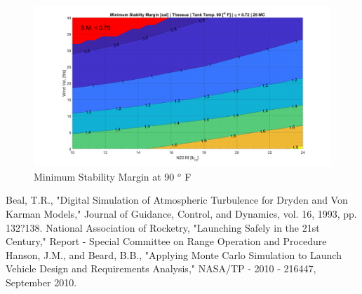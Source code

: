\documentclass[10pt,a4paper]{article}
\begin{document}
 \begin{figure}[h!]
	\centering
	\includegraphics[width=1\textwidth]{./figs/stab_90.png}
	\caption{Minimum Stability Margin at 90 $^o$ F}
	\label{fig:stab_90}
\end{figure}
 
 
 
  
\begin{thebibliography}{10}
	Beal, T.R., 
	"Digital Simulation of Atmospheric Turbulence for Dryden and Von Karman Models,"
	Journal of Guidance, Control, and Dynamics, vol. 16, 1993, pp. 132?138.
	National Association of Rocketry,
	"Launching Safely in the 21st Century,"
	Report - Special Committee on Range Operation and Procedure
	Hanson, J.M., and Beard, B.B.,
	"Applying Monte Carlo Simulation to Launch Vehicle Design and Requirements Analysis,"
	NASA/TP - 2010 - 216447, September 2010.
\end{thebibliography}
\end{document}
